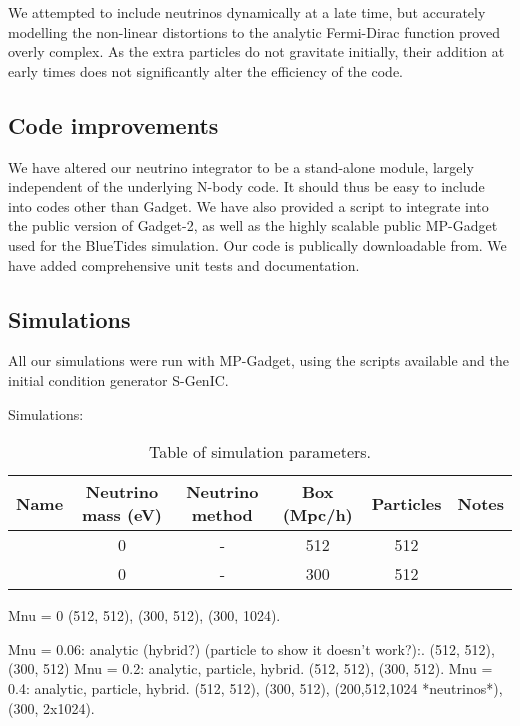 \documentclass[useAMS, usenatbib]{mnras}
\begin{document}
We attempted to include neutrinos dynamically at a late time, but
accurately modelling the non-linear distortions to the analytic
Fermi-Dirac function proved overly complex. As the extra particles
do not gravitate initially, their addition at early times does
not significantly alter the efficiency of the code.


\subsection{Code improvements}
\label{sec:code}

We have altered our neutrino integrator to be a stand-alone module, largely
independent of the underlying N-body code. It should thus be easy to include
into codes other than Gadget. We have also provided a script to integrate into the
public version of Gadget-2, as well as the highly scalable public MP-Gadget
used for the BlueTides simulation. Our code is publically downloadable from.
We have added comprehensive unit tests and documentation.

\subsection{Simulations}
\label{sec:simulations}

All our simulations were run with MP-Gadget, using the scripts available
and the initial condition generator S-GenIC.

Simulations:
\begin{table}
\begin{center}
\begin{tabular}{|l|c|c|c|c|l|}
\hline
Name & Neutrino mass (eV) & Neutrino method & Box (Mpc/h) & Particles & Notes \\
\hline
    &       0             &    -            & 512         & 512       &       \\
    &       0             &    -            & 300         & 512       &       \\
\hline
\end{tabular}
\end{center}
\caption{Table of simulation parameters. 
}
\label{tab:simulations}
\end{table}

Mnu = 0  (512, 512), (300, 512), (300, 1024).

Mnu = 0.06: analytic (hybrid?) (particle to show it doesn't work?):.
(512, 512), (300, 512)
Mnu = 0.2: analytic, particle, hybrid.
(512, 512), (300, 512).
Mnu = 0.4: analytic, particle, hybrid.
(512, 512), (300, 512), (200,512,1024 *neutrinos*), (300, 2x1024).
\end{document}
